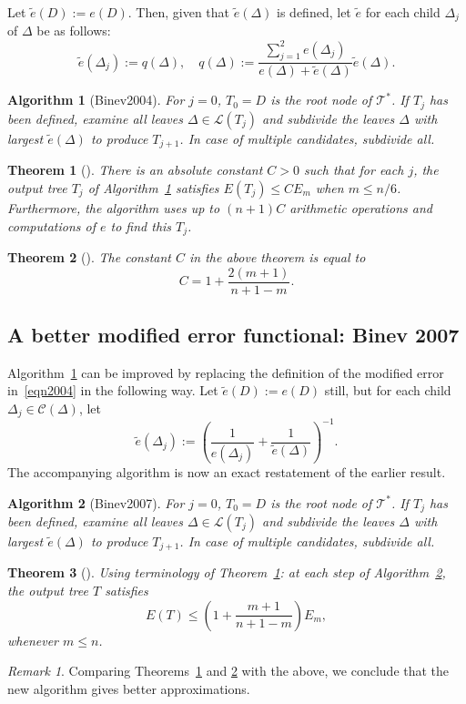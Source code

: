 \documentclass[11pt]{report}
\newtheorem{algorithm}{Algorithm}
\newtheorem{theorem}{Theorem}
\theoremstyle{definition}
\theoremstyle{remark}
\newtheorem*{remark}{Remark}
\newcommand{\C}{\mathcal{C}}
\newcommand{\T}{\mathcal{T}}
\renewcommand{\L}{\mathcal{L}}
\newcommand{\node}{\Delta}
\newcommand{\te}{\tilde e}
\begin{document}
Let $\te(D) := e(D)$. Then, given that $\te(\node)$ is defined, let $\te$ for each child $\node_j$ of $\node$ be as follows:
\begin{equation}
  \label{eqn2004}
  \te(\node_j) := q(\node), \quad q(\node) := \frac{\sum_{j=1}^2 e(\node_j)}{e(\node) + \te(\node)} \te(\node).
\end{equation}
\begin{algorithm}[Binev2004{\cite[p.~204]{2004}}]
  \label{alg:2004}
  For $j=0$, $T_0 = D$ is the root node of $\T^*$. If $T_j$ has been defined, examine all leaves $\node \in \L(T_j)$ and subdivide the leaves $\node$ with largest $\te(\node)$ to produce $T_{j+1}$. In case of multiple candidates, subdivide all.
\end{algorithm}
\begin{theorem}[{\cite[Thm.~5.2]{2004}}]
  \label{thm:2004}
  There is an absolute constant $C > 0$ such that for each $j$, the output tree $T_j$ of Algorithm~\ref{alg:2004} satisfies $E(T_j) \leq C E_m$ when $m \leq n/6$. Furthermore, the algorithm uses up to $(n + 1)C$ arithmetic operations and computations of $e$ to find this $T_j$.
\end{theorem}
\begin{theorem}[{\cite[Thm.~2]{2007}}]
  \label{thm:2004C}
  The constant $C$ in the above theorem is equal to
  \[
    C = 1 + \frac{2( m + 1)}{n + 1 - m}.
  \]
\end{theorem}

\subsection{A better modified error functional: Binev 2007}
Algorithm~\ref{alg:2004} can be improved by replacing the definition of the modified error in~\eqref{eqn2004} in the following way. Let $\te(D) := e(D)$ still, but for each child $\node_j \in \C(\node)$, let
\[
  \te(\node_j) := \left( \frac{1}{e(\node_j)} + \frac{1}{\te(\node)}\right)^{-1}.
\]
The accompanying algorithm is now an exact restatement of the earlier result.
\begin{algorithm}[Binev2007{\cite{2007}}]
  \label{alg:2007}
  For $j=0$, $T_0 = D$ is the root node of $\T^*$. If $T_j$ has been defined, examine all leaves $\node \in \L(T_j)$ and subdivide the leaves $\node$ with largest $\te(\node)$ to produce $T_{j+1}$. In case of multiple candidates, subdivide all.
\end{algorithm}
\begin{theorem}[{\cite[Thm.~4]{2007}}]
  \label{thm:2007}
  Using terminology of Theorem~\ref{thm:2004}: at each step of Algorithm~\ref{alg:2007}, the output tree $T$ satisfies
  \[
    E(T) \leq \left( 1 + \frac{m+1}{n + 1 - m} \right) E_m,
  \]
  whenever $m \leq n$.
\end{theorem}
\begin{remark}
  Comparing Theorems~\ref{thm:2004} and \ref{thm:2004C} with the above, we conclude that the new algorithm gives better approximations.
\end{remark}
\end{document}
